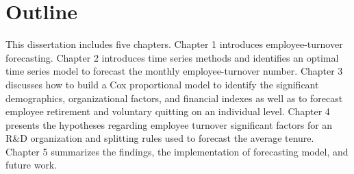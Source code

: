 \section{Outline}
This dissertation includes five chapters. Chapter 1 introduces employee-turnover forecasting. Chapter 2 introduces time series methods and identifies an optimal time series model to forecast the monthly employee-turnover number. Chapter 3 discusses how to build a Cox proportional model to identify the significant demographics, organizational factors, and financial indexes as well as to forecast employee retirement and voluntary quitting on an individual level. Chapter 4 presents the hypotheses regarding employee turnover significant factors for an R\&D organization and splitting rules used to forecast the average tenure. Chapter 5 summarizes the findings, the implementation of forecasting model, and future work.

